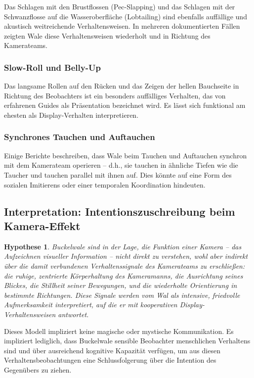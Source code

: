 ﻿\documentclass[12pt,a4paper]{article}
\newtheorem{hypothese}{Hypothese}[section]
\theoremstyle{definition}
\theoremstyle{remark}
\begin{document}
Das Schlagen mit den Brustflossen (Pec-Slapping) und das Schlagen mit der
Schwanzflosse auf die Wasseroberfläche (Lobtailing) sind ebenfalls
auffällige und akustisch weitreichende Verhaltensweisen. In mehreren
dokumentierten Fällen zeigten Wale diese Verhaltensweisen wiederholt und
in Richtung des Kamerateams.

\subsubsection{Slow-Roll und Belly-Up}

Das langsame Rollen auf den Rücken und das Zeigen der hellen Bauchseite in
Richtung des Beobachters ist ein besonders auffälliges Verhalten, das
von erfahrenen Guides als Präsentation bezeichnet wird. Es lässt sich
funktional am ehesten als Display-Verhalten interpretieren.

\subsubsection{Synchrones Tauchen und Auftauchen}

Einige Berichte beschreiben, dass Wale beim Tauchen und Auftauchen synchron
mit dem Kamerateam operieren -- d.h., sie tauchen in ähnliche Tiefen wie die
Taucher und tauchen parallel mit ihnen auf. Dies könnte auf eine Form des
sozialen Imitierens oder einer temporalen Koordination hindeuten.

\subsection{Interpretation: Intentionszuschreibung beim Kamera-Effekt}

\begin{hypothese}
  \label{hyp:kamera}
  Buckelwale sind in der Lage, die Funktion einer Kamera -- das Aufzeichnen
  visueller Information -- nicht direkt zu verstehen, wohl aber indirekt
  über die damit verbundenen Verhaltenssignale des Kamerateams zu erschließen:
  die ruhige, zentrierte Körperhaltung des Kameramanns, die Ausrichtung seines
  Blickes, die Stillheit seiner Bewegungen, und die wiederholte Orientierung
  in bestimmte Richtungen. Diese Signale werden vom Wal als
  intensive, friedvolle Aufmerksamkeit interpretiert, auf die er mit
  kooperativen Display-Verhaltensweisen antwortet.
\end{hypothese}

Dieses Modell impliziert keine magische oder mystische Kommunikation. Es
impliziert lediglich, dass Buckelwale sensible Beobachter menschlichen
Verhaltens sind und über ausreichend kognitive Kapazität verfügen, um aus
diesen Verhaltensbeobachtungen eine Schlussfolgerung über die Intention
des Gegenübers zu ziehen.
\end{document}
